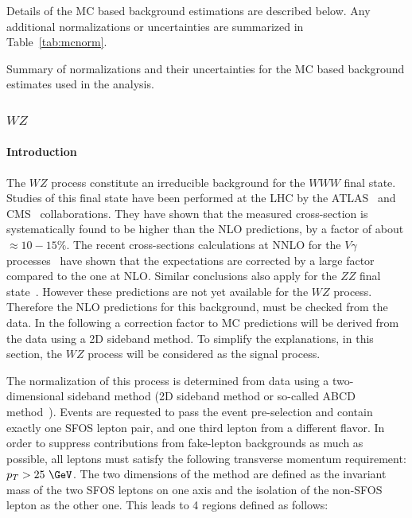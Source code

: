 
Details of the MC based background estimations are described below.
Any additional normalizations or uncertainties are summarized
in Table~\ref{tab:mcnorm}.

\begin{table}[htp]
\centering

\caption{Summary of normalizations and their uncertainties for the
MC based background estimates used in the analysis.}
\label{tab:mcnorm}
\end{table}



\subsubsection{$WZ$}
\label{sec:wzbg}

\paragraph{Introduction}
The $WZ$ process constitute an irreducible background for the $WWW$ final state. Studies of this final state have been performed at the LHC by the ATLAS~\cite{Aad:2012twa,Anger:1663539} and CMS~\cite{CMS-PAS-SMP-12-006} collaborations. They have shown that the measured cross-section is systematically found to be higher than the NLO predictions, by a factor of about $\approx{}10-15\%$. The recent cross-sections calculations at NNLO for the $V\gamma$ processes~\cite{Grazzini:2015nwa} have shown that the expectations are corrected by a large factor compared to the one at NLO. Similar conclusions also apply for the $ZZ$ final state~\cite{Cascioli:2014yka}. However these predictions are not yet available for the $WZ$ process. Therefore the NLO predictions for this background, must be checked from the data. In the following a correction factor to MC predictions will be derived from the data using a 2D sideband method. To simplify the explanations, in this section, the $WZ$ process will be considered as the signal process.

The normalization of this process is determined from data using a two-dimensional sideband method (2D sideband method or so-called ABCD method~\cite{Aad:2013izg}). Events are requested to pass the event pre-selection and contain exactly one SFOS lepton pair, and one third lepton from a different flavor. In order to suppress contributions from fake-lepton backgrounds as much as possible, all leptons must satisfy the following transverse momentum requirement: $p_{T}>25~\GeV$. The two dimensions of the method are defined as the invariant mass of the two SFOS leptons on one axis and the isolation of the non-SFOS lepton as the other one. This leads to 4 regions defined as follows:

